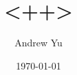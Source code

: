 \documentclass[xcolor=dvipsnames,aspectratio=43]{beamer}
\title[<++>]{<++>}
\date{\today}
\author[A.Y.]{Andrew Yu}
\begin{document}
\begin{frame}
  \titlepage
\end{frame}
\end{document}

